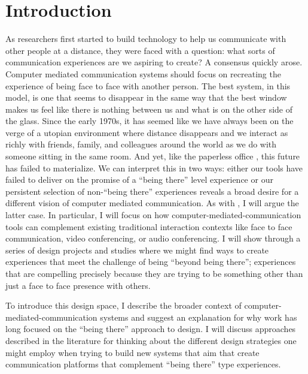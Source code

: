\chapter{Introduction}
\label{ch:intro}


As researchers first started to build technology to help us communicate with other people at a distance, they were faced with a question: what sorts of communication experiences are we aspiring to create? A consensus quickly arose. Computer mediated communication systems should focus on recreating the experience of being face to face with another person. The best system, in this model, is one that seems to disappear in the same way that the best window makes us feel like there is nothing between us and what is on the other side of the glass. Since the early 1970s, it has seemed like we have always been on the verge of a utopian environment where distance disappears and we interact as richly with friends, family, and colleagues around the world as we do with someone sitting in the same room. \citep{Egido:1988vq} And yet, like the paperless office \citep{Sellen:2001uk}, this future has failed to materialize. We can interpret this in two ways: either our tools have failed to deliver on the promise of a ``being there'' level experience or our persistent selection of non-``being there'' experiences reveals a broad desire for a different vision of computer mediated communication. As with \citet{Hollan:1992tz}, I will argue the latter case. In particular, I will focus on how  computer-mediated-communication tools can complement existing traditional interaction contexts like face to face communication, video conferencing, or audio conferencing. I will show through a series of design projects and studies where we might find ways to create experiences that meet the challenge of being ``beyond being there''; experiences that are compelling precisely because they are trying to be something other than just a face to face presence with others.

To introduce this design space, I describe the broader context of computer-mediated-communication systems and suggest an explanation for why work has long focused on the ``being there'' approach to design. I will discuss approaches described in the literature for thinking about the different design strategies one might employ when trying to build new systems that aim that create communication platforms that complement ``being there'' type experiences.


